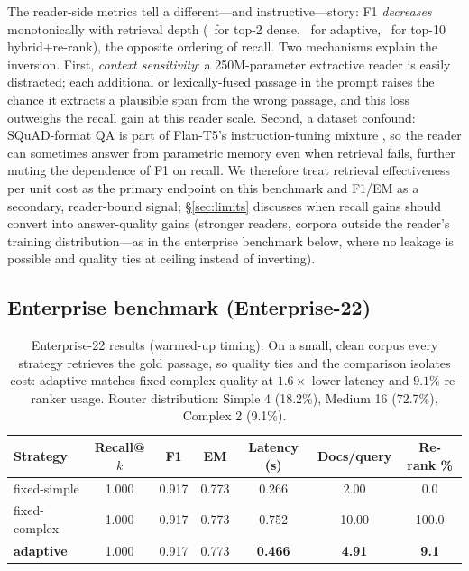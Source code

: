 \documentclass[11pt]{article}
\newcommand{\enAdRec}{1.000}\newcommand{\enAdFone}{0.917}\newcommand{\enAdEM}{0.773}
\newcommand{\enAdLat}{0.466}\newcommand{\enAdDocs}{4.91}\newcommand{\enAdRr}{9.1}
\newcommand{\enSiRec}{1.000}\newcommand{\enSiFone}{0.917}\newcommand{\enSiEM}{0.773}
\newcommand{\enSiLat}{0.266}\newcommand{\enSiDocs}{2.00}\newcommand{\enSiRr}{0.0}
\newcommand{\enCoRec}{1.000}\newcommand{\enCoFone}{0.917}\newcommand{\enCoEM}{0.773}
\newcommand{\enCoLat}{0.752}\newcommand{\enCoDocs}{10.00}\newcommand{\enCoRr}{100.0}
\begin{document}
The reader-side metrics tell a different---and instructive---story: F1
\emph{decreases} monotonically with retrieval depth (\sqSiFone\ for top-2
dense, \sqAdFone\ for adaptive, \sqCoFone\ for top-10 hybrid+re-rank), the
opposite ordering of recall. Two mechanisms explain the inversion. First,
\emph{context sensitivity}: a 250M-parameter extractive reader is easily
distracted; each additional or lexically-fused passage in the prompt raises
the chance it extracts a plausible span from the wrong passage, and this loss
outweighs the recall gain at this reader scale. Second, a dataset confound:
SQuAD-format QA is part of Flan-T5's instruction-tuning mixture
\citep{chung2024flan}, so the reader can sometimes answer from parametric
memory even when retrieval fails, further muting the dependence of F1 on
recall. We therefore treat retrieval effectiveness per unit cost as the
primary endpoint on this benchmark and F1/EM as a secondary, reader-bound
signal; \S\ref{sec:limits} discusses when recall gains should convert into
answer-quality gains (stronger readers, corpora outside the reader's training
distribution---as in the enterprise benchmark below, where no leakage is
possible and quality ties at ceiling instead of inverting).

\subsection{Enterprise benchmark (Enterprise-22)}

\begin{table}[t]
\centering\small
\begin{tabular}{lcccccc}
\toprule
Strategy & Recall@$k$ & F1 & EM & Latency (s) & Docs/query & Re-rank \% \\
\midrule
fixed-simple  & \enSiRec & \enSiFone & \enSiEM & \enSiLat & \enSiDocs & \enSiRr \\
fixed-complex & \enCoRec & \enCoFone & \enCoEM & \enCoLat & \enCoDocs & \enCoRr \\
\textbf{adaptive} & \enAdRec & \enAdFone & \enAdEM & \textbf{\enAdLat} & \textbf{\enAdDocs} & \textbf{\enAdRr} \\
\bottomrule
\end{tabular}
\caption{Enterprise-22 results (warmed-up timing). On a small, clean corpus
every strategy retrieves the gold passage, so quality ties and the comparison
isolates cost: adaptive matches fixed-complex quality at $1.6\times$ lower
latency and $9.1$\% re-ranker usage. Router distribution: Simple 4 (18.2\%),
Medium 16 (72.7\%), Complex 2 (9.1\%).}
\label{tab:enterprise}
\end{table}
\end{document}
